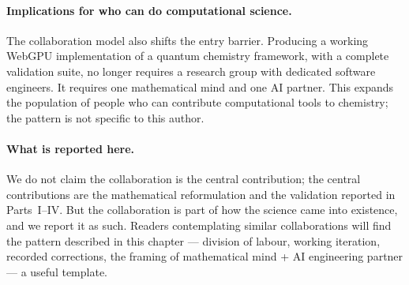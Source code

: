 \paragraph{Implications for who can do computational science.}
The collaboration model also shifts the entry barrier. Producing a working WebGPU implementation of a quantum chemistry framework, with a complete validation suite, no longer requires a research group with dedicated software engineers. It requires one mathematical mind and one AI partner. This expands the population of people who can contribute computational tools to chemistry; the pattern is not specific to this author.

\paragraph{What is reported here.}
We do not claim the collaboration is the central contribution; the central contributions are the mathematical reformulation and the validation reported in Parts~I--IV. But the collaboration is part of how the science came into existence, and we report it as such. Readers contemplating similar collaborations will find the pattern described in this chapter --- division of labour, working iteration, recorded corrections, the framing of mathematical mind + AI engineering partner --- a useful template.

